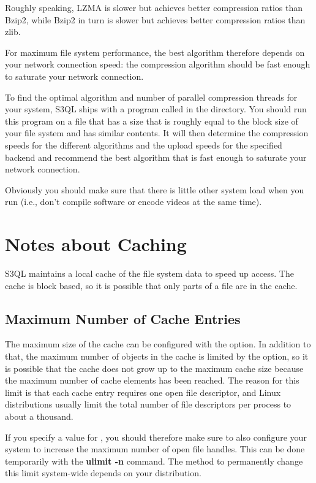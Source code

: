 \documentclass[letterpaper,10pt,english]{sphinxmanual}
\begin{document}
Roughly speaking, LZMA is slower but achieves better compression
ratios than Bzip2, while Bzip2 in turn is slower but achieves better
compression ratios than zlib.

For maximum file system performance, the best algorithm therefore
depends on your network connection speed: the compression algorithm
should be fast enough to saturate your network connection.

To find the optimal algorithm and number of parallel compression
threads for your system, S3QL ships with a program called
 in the  directory. You should run this program
on a file that has a size that is roughly equal to the block size of
your file system and has similar contents. It will then determine the
compression speeds for the different algorithms and the upload speeds
for the specified backend and recommend the best algorithm that is
fast enough to saturate your network connection.

Obviously you should make sure that there is little other system load
when you run  (i.e., don't compile software or encode
videos at the same time).


\section{Notes about Caching}
\label{mount:notes-about-caching}
S3QL maintains a local cache of the file system data to speed up
access. The cache is block based, so it is possible that only parts of
a file are in the cache.


\subsection{Maximum Number of Cache Entries}
\label{mount:maximum-number-of-cache-entries}
The maximum size of the cache can be configured with the
 option. In addition to that, the maximum number
of objects in the cache is limited by the
 option, so it is possible that the cache
does not grow up to the maximum cache size because the maximum number
of cache elements has been reached. The reason for this limit is that
each cache entry requires one open file descriptor, and Linux
distributions usually limit the total number of file descriptors per
process to about a thousand.

If you specify a value for , you should
therefore make sure to also configure your system to increase the
maximum number of open file handles. This can be done temporarily with
the \textbf{ulimit -n} command. The method to permanently change this limit
system-wide depends on your distribution.
\end{document}
